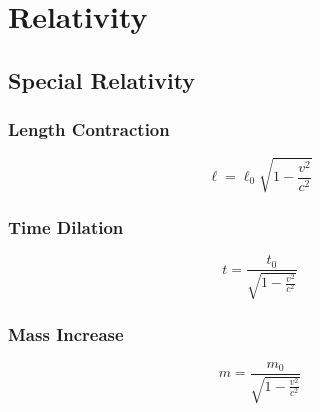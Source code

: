 \chapter{Relativity} \label{chap:relativity}

\section{Special Relativity}  


	
\subsection{Length Contraction} 

	\begin{mdframed}[backgroundcolor=orange!20!white]
	\begin{equation}
		\ell = \ell_0 \sqrt{1-\frac{v^2}{c^2}}
		\label{equation:lengthcontraction}
	\end{equation}
\end{mdframed}	


\subsection{Time Dilation} 
	\begin{mdframed}[backgroundcolor=orange!20!white]
	\begin{equation}
		t = \frac{t_0}{\sqrt{1-\frac{v^2}{c^2}}}
		\label{equation:timedilation}
	\end{equation}
\end{mdframed}	


\subsection{Mass Increase} 

	\begin{mdframed}[backgroundcolor=orange!20!white]
	\begin{equation}
		m = \frac{m_0}{\sqrt{1-\frac{v^2}{c^2}}}
		\label{equation:massincrease}
	\end{equation}
\end{mdframed}

